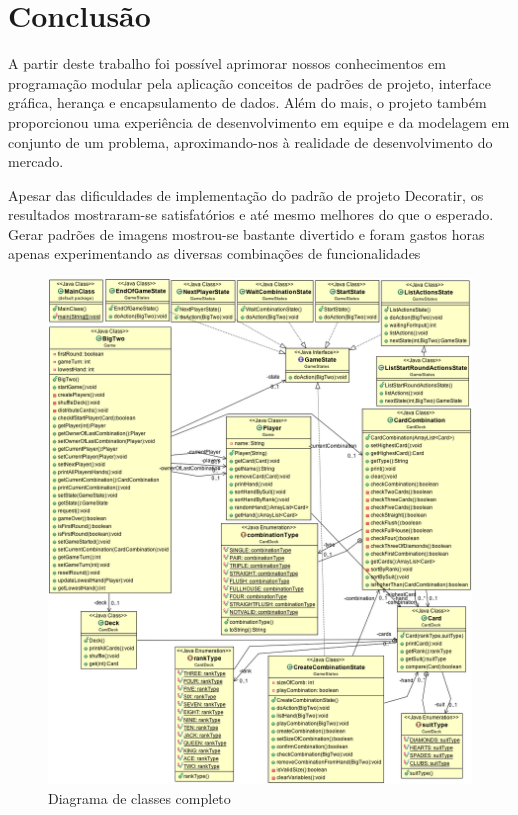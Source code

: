 \documentclass[12pt]{article}
\begin{document}
\section{Conclusão}
\label{conclusao}
A partir deste trabalho foi possível aprimorar nossos conhecimentos em programação modular pela aplicação conceitos de padrões de projeto, 
interface gráfica, herança e encapsulamento de dados. Além do mais, o projeto também proporcionou uma experiência de desenvolvimento em equipe
e da modelagem em conjunto de um problema, aproximando-nos à realidade de desenvolvimento do mercado.

Apesar das dificuldades de implementação do padrão de projeto Decoratir, os resultados mostraram-se satisfatórios e até mesmo melhores do que
o esperado. Gerar padrões de imagens mostrou-se bastante divertido e foram gastos horas apenas experimentando as diversas combinações de funcionalidades




\begin{figure}[h!]
	\centering
	\includegraphics[width=.8\textwidth]{umlfull.png}
	\caption{Diagrama de classes completo}
	\label{umlfull}
\end{figure}
\end{document}
